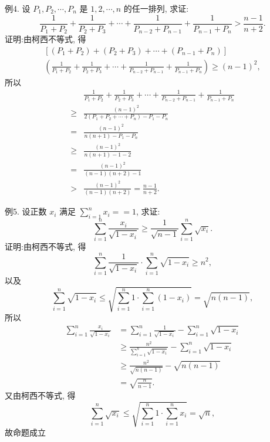 例4. 设 $P_1, P_2, \cdots, P_n$ 是 $1,2, \cdots, n$ 的任一排列, 求证:
$$
\frac{1}{P_1+P_2}+\frac{1}{P_2+P_3}+\cdots+\frac{1}{P_{n-2}+P_{n-1}}+\frac{1}{P_{n-1}+P_n}>\frac{n-1}{n+2} .
$$
证明:由柯西不等式, 得
$$
\begin{gathered}
{\left[\left(P_1+P_2\right)+\left(P_2+P_3\right)+\cdots+\left(P_{n-1}+P_n\right)\right]} \\
\left(\frac{1}{P_1+P_2}+\frac{1}{P_2+P_3}+\cdots+\frac{1}{P_{n-2}+P_{n-1}}+\frac{1}{P_{n-1}+P_n}\right) \geqslant(n-1)^2,
\end{gathered}
$$
所以
$$
\begin{aligned}
& \frac{1}{P_1+P_2}+\frac{1}{P_2+P_3}+\cdots+\frac{1}{P_{n-2}+P_{n-1}}+\frac{1}{P_{n-1}+P_n} \\
\geqslant & \frac{(n-1)^2}{2\left(P_1+P_2+\cdots+P_n\right)-P_1-P_n} \\
= & \frac{(n-1)^2}{n(n+1)-P_1-P_n} \\
\geqslant & \frac{(n-1)^2}{n(n+1)-1-2} \\
= & \frac{(n-1)^2}{(n-1)(n+2)-1} \\
> & \frac{(n-1)^2}{(n-1)(n+2)}=\frac{n-1}{n+2} .
\end{aligned}
$$



例5. 设正数 $x_i$ 满足 $\sum_{i=1}^n x_i==1$, 求证:
$$
\sum_{i=1}^n \frac{x_i}{\sqrt{1-x_i}} \geqslant \frac{1}{\sqrt{n-1}} \sum_{i=1}^n \sqrt{x_i} .
$$
证明:由柯西不等式, 得
$$
\sum_{i=1}^n \frac{1}{\sqrt{1-x_i}} \cdot \sum_{i=1}^n \sqrt{1-x_i} \geqslant n^2,
$$
以及
$$
\sum_{i=1}^n \sqrt{1-x_i} \leqslant \sqrt{\sum_{i=1}^n 1 \cdot \sum_{i=1}^n\left(1-x_i\right)}=\sqrt{n(n-1)},
$$
所以
$$
\begin{aligned}
\sum_{i=1}^n \frac{x_i}{\sqrt{1-x_i}} & =\sum_{i=1}^n \frac{1}{\sqrt{1-x_i}}-\sum_{i=1}^n \sqrt{1-x_i} \\
& \geqslant \frac{n^2}{\sum_{i=1}^n \sqrt{1-x_i}}-\sum_{i=1}^n \sqrt{1-x_i} \\
& \geqslant \frac{n^2}{\sqrt{n(n-1)}}-\sqrt{n(n-1)} \\
& =\sqrt{\frac{n}{n-1}} .
\end{aligned}
$$
又由柯西不等式, 得
$$
\sum_{i=1}^n \sqrt{x_i} \leqslant \sqrt{\sum_{i=1}^n 1 \cdot \sum_{i=1}^n x_i}=\sqrt{n},
$$
故命题成立



